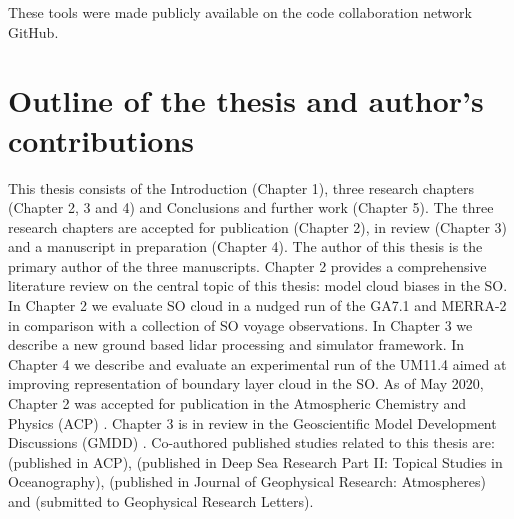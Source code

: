 \noindent
These tools were made publicly available on the code collaboration network
GitHub.

\section{Outline of the thesis and author's contributions}

This thesis consists of the Introduction (Chapter 1), three research chapters
(Chapter 2, 3 and 4) and Conclusions and further work (Chapter 5). The three
research chapters are accepted for publication (Chapter 2),
in review (Chapter 3) and a manuscript in preparation (Chapter 4).
The author of this thesis is the primary author of the three manuscripts.
Chapter 2 provides a comprehensive literature review on the central topic
of this thesis: model cloud biases in the SO. In Chapter 2 we evaluate
SO cloud in a nudged run of the GA7.1 and MERRA-2 in comparison
with a collection of SO voyage observations. In Chapter 3 we
describe a new ground based lidar processing and simulator framework.
In Chapter 4 we describe and evaluate an experimental run of the UM11.4 aimed at
improving representation of boundary layer cloud in the SO.
As of May 2020, Chapter 2 was accepted for publication in the Atmospheric
Chemistry and Physics (ACP) \citep{kuma2020a}. Chapter 3 is in review in the
Geoscientific Model Development Discussions (GMDD) \citep{kuma2020b}.
Co-authored published studies related to this thesis are: \cite{jolly2018}
(published in ACP), \cite{klekociuk2018} (published in Deep Sea Research Part II: Topical Studies in Oceanography), \cite{hartery2020a}
(published in Journal of Geophysical Research: Atmospheres) and
\cite{hartery2020b} (submitted to Geophysical Research Letters).
